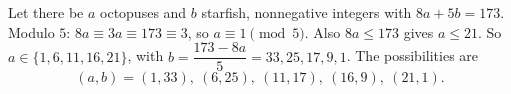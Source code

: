 Let there be $a$ octopuses and $b$ starfish, nonnegative integers with $8a+5b=173$. Modulo $5$: $8a\equiv3a\equiv173\equiv3$, so $a\equiv1\pmod5$. Also $8a\le173$ gives $a\le21$. So $a\in\{1,6,11,16,21\}$, with $b=\dfrac{173-8a}{5}=33,25,17,9,1$. The possibilities are
\[\boxed{(a,b)=(1,33),\ (6,25),\ (11,17),\ (16,9),\ (21,1)}.\]
